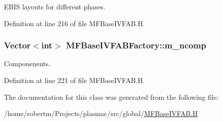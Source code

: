 E\+B\+IS layouts for different phases. 



Definition at line 216 of file M\+F\+Base\+I\+V\+F\+A\+B.\+H.

\subsubsection[{\texorpdfstring{m\+\_\+ncomp}{m_ncomp}}]{\setlength{\rightskip}{0pt plus 5cm}Vector$<$int$>$ M\+F\+Base\+I\+V\+F\+A\+B\+Factory\+::m\+\_\+ncomp\hspace{0.3cm}{\ttfamily [protected]}}\hypertarget{classMFBaseIVFABFactory_a4ab099a53f47682a8c5ffe0284f41762}{}\label{classMFBaseIVFABFactory_a4ab099a53f47682a8c5ffe0284f41762}


Componenents. 



Definition at line 221 of file M\+F\+Base\+I\+V\+F\+A\+B.\+H.



The documentation for this class was generated from the following file\+:\begin{DoxyCompactItemize}
\item 
/home/robertm/\+Projects/plasmac/src/global/\hyperlink{MFBaseIVFAB_8H}{M\+F\+Base\+I\+V\+F\+A\+B.\+H}\end{DoxyCompactItemize}
